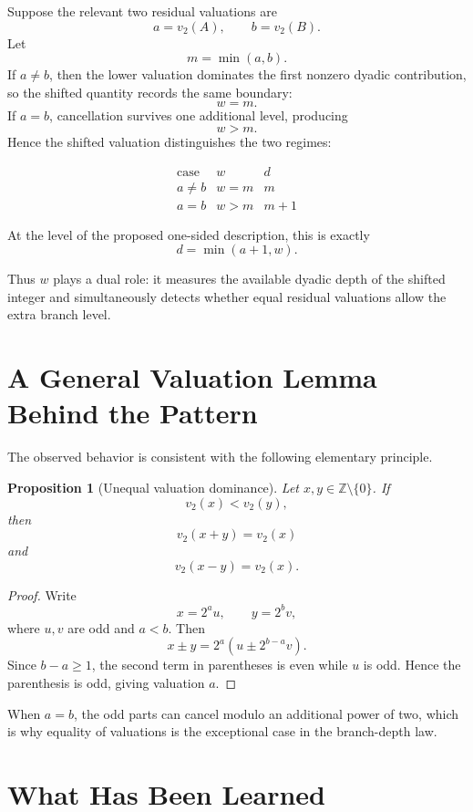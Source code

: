\documentclass[11pt,a4paper]{article}
\newtheorem{proposition}[definition]{Proposition}
\newcommand{\vTwo}{v_2}
\newcommand{\Z}{\mathbb{Z}}
\begin{document}
Suppose the relevant two residual valuations are
\[
    a=\vTwo(A),
    \qquad
    b=\vTwo(B).
\]
Let
\[
    m=\min(a,b).
\]
If $a\ne b$, then the lower valuation dominates the first nonzero dyadic contribution, so the shifted quantity records the same boundary:
\[
    w=m.
\]
If $a=b$, cancellation survives one additional level, producing
\[
    w>m.
\]
Hence the shifted valuation distinguishes the two regimes:

\[
\begin{array}{c|c|c}
\text{case} & w & d \\
\hline
 a\ne b & w=m & m \\
 a=b & w>m & m+1
\end{array}
\]

At the level of the proposed one-sided description, this is exactly
\[
    d=\min(a+1,w).
\]

Thus $w$ plays a dual role: it measures the available dyadic depth of the shifted integer and simultaneously detects whether equal residual valuations allow the extra branch level.

\section{A General Valuation Lemma Behind the Pattern}

The observed behavior is consistent with the following elementary principle.

\begin{proposition}[Unequal valuation dominance]
Let $x,y\in\Z\setminus\{0\}$. If
\[
    \vTwo(x)<\vTwo(y),
\]
then
\[
    \vTwo(x+y)=\vTwo(x)
\]
and
\[
    \vTwo(x-y)=\vTwo(x).
\]
\end{proposition}

\begin{proof}
Write
\[
    x=2^a u,
    \qquad
    y=2^b v,
\]
where $u,v$ are odd and $a<b$. Then
\[
    x\pm y
    =2^a\left(u\pm2^{b-a}v\right).
\]
Since $b-a\ge1$, the second term in parentheses is even while $u$ is odd. Hence the parenthesis is odd, giving valuation $a$.
\end{proof}

When $a=b$, the odd parts can cancel modulo an additional power of two, which is why equality of valuations is the exceptional case in the branch-depth law.

\section{What Has Been Learned}
\end{document}

